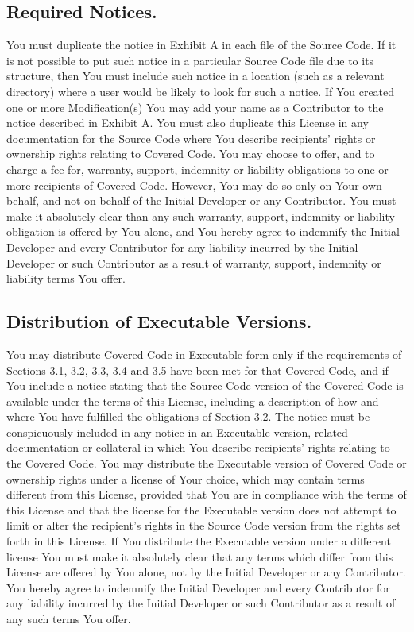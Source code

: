\documentclass[letterpaper,colorlinks=true,linkcolor=blue]{book}
\begin{document}
\subsection{Required Notices.}
You must duplicate the notice in Exhibit A in each file of the Source Code. If it is not possible to put such notice in a particular Source Code file due to its structure, then You must include such notice in a location (such as a relevant directory) where a user would be likely to look for such a notice. If You created one or more Modification(s) You may add your name as a Contributor to the notice described in Exhibit A. You must also duplicate this License in any documentation for the Source Code where You describe recipients' rights or ownership rights relating to Covered Code. You may choose to offer, and to charge a fee for, warranty, support, indemnity or liability obligations to one or more recipients of Covered Code. However, You may do so only on Your own behalf, and not on behalf of the Initial Developer or any Contributor. You must make it absolutely clear than any such warranty, support, indemnity or liability obligation is offered by You alone, and You hereby agree to indemnify the Initial Developer and every Contributor for any liability incurred by the Initial Developer or such Contributor as a result of warranty, support, indemnity or liability terms You offer. 

\subsection{Distribution of Executable Versions.}
You may distribute Covered Code in Executable form only if the requirements of Sections 3.1, 3.2, 3.3, 3.4 and 3.5 have been met for that Covered Code, and if You include a notice stating that the Source Code version of the Covered Code is available under the terms of this License, including a description of how and where You have fulfilled the obligations of Section 3.2. The notice must be conspicuously included in any notice in an Executable version, related documentation or collateral in which You describe recipients' rights relating to the Covered Code. You may distribute the Executable version of Covered Code or ownership rights under a license of Your choice, which may contain terms different from this License, provided that You are in compliance with the terms of this License and that the license for the Executable version does not attempt to limit or alter the recipient's rights in the Source Code version from the rights set forth in this License. If You distribute the Executable version under a different license You must make it absolutely clear that any terms which differ from this License are offered by You alone, not by the Initial Developer or any Contributor. You hereby agree to indemnify the Initial Developer and every Contributor for any liability incurred by the Initial Developer or such Contributor as a result of any such terms You offer. 
\end{document}
